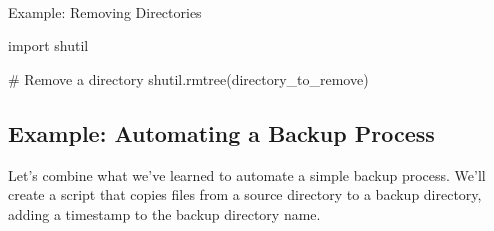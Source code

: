 \documentclass[
  letterpaper,
  DIV=11,
  numbers=noendperiod]{scrreprt}
\makeatletter
\let\oldparagraph\paragraph
\renewcommand{\paragraph}{
    \@ifstar
      \xxxParagraphStar
      \xxxParagraphNoStar
  }
\newcommand{\xxxParagraphStar}[1]{\oldparagraph*{#1}\mbox{}}
\newcommand{\xxxParagraphNoStar}[1]{\oldparagraph{#1}\mbox{}}
\newenvironment{Shaded}{\begin{snugshade}}{\end{snugshade}}
\newcommand{\CommentTok}[1]{\textcolor[rgb]{0.37,0.37,0.37}{#1}}
\newcommand{\ImportTok}[1]{\textcolor[rgb]{0.00,0.46,0.62}{#1}}
\newcommand{\NormalTok}[1]{\textcolor[rgb]{0.00,0.23,0.31}{#1}}
\newcommand{\StringTok}[1]{\textcolor[rgb]{0.13,0.47,0.30}{#1}}
\makeatother
\begin{document}
\paragraph{Example: Removing
Directories}\label{example-removing-directories}

\begin{Shaded}
\begin{Highlighting}[]
\ImportTok{import}\NormalTok{ shutil}

\CommentTok{\# Remove a directory}
\NormalTok{shutil.rmtree(}\StringTok{\textquotesingle{}directory\_to\_remove\textquotesingle{}}\NormalTok{)}
\end{Highlighting}
\end{Shaded}

\subsection{Example: Automating a Backup
Process}\label{example-automating-a-backup-process}

Let's combine what we've learned to automate a simple backup process.
We'll create a script that copies files from a source directory to a
backup directory, adding a timestamp to the backup directory name.
\end{document}
